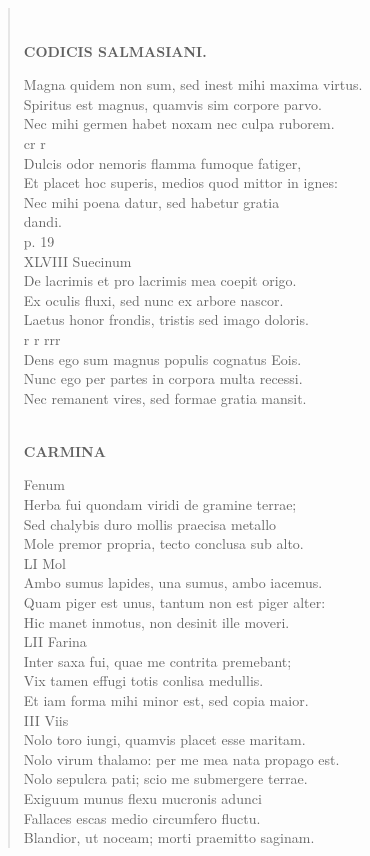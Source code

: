 \documentclass[11pt, a4paper]{report}
\begin{document}
\begin{verse}
        ﻿\pagebreak 
    \begin{center} \textbf{CODICIS SALMASIANI.} \end{center} \marginpar{[233]} Magna quidem non sum, sed inest mihi maxima virtus. \\ Spiritus est magnus, quamvis sim corpore parvo. \\ Nec mihi germen habet noxam nec culpa ruborem. \\ cr r \\ Dulcis odor nemoris flamma fumoque fatiger, \\ Et placet hoc superis, medios quod mittor in ignes: \\ Nec mihi poena datur, sed habetur gratia \\ dandi. \\ p. 19 \\ XLVIII Suecinum \\ De lacrimis et pro lacrimis mea coepit origo. \\ Ex oculis fluxi, sed nunc ex arbore nascor. \\ Laetus honor frondis, tristis sed imago doloris. \\ r r rrr \\ Dens ego sum magnus populis cognatus Eois. \\ Nunc ego per partes in corpora multa recessi. \\ Nec remanent vires, sed formae gratia mansit. \\ 
        ﻿\pagebreak 
    \begin{center} \textbf{CARMINA} \end{center} \marginpar{[234]}  \marginpar{[02]} Fenum \\ Herba fui quondam viridi de gramine terrae; \\ Sed chalybis duro mollis praecisa metallo \\ Mole premor propria, tecto conclusa sub alto. \\ LI Mol \\ Ambo sumus lapides, una sumus, ambo iacemus. \\ Quam piger est unus, tantum non est piger alter: \\ Hic manet inmotus, non desinit ille moveri. \\ LII Farina \\ Inter saxa fui, quae me contrita premebant; \\ Vix tamen effugi totis conlisa medullis. \\ Et iam forma mihi minor est, sed copia maior. \\ III Viis \\ Nolo toro iungi, quamvis placet esse maritam. \\ Nolo virum thalamo: per me mea nata propago est. \\ Nolo sepulcra pati; scio me submergere terrae. \\ Exiguum munus flexu mucronis adunci \\ Fallaces escas medio circumfero fluctu. \\ Blandior, ut noceam; morti praemitto saginam. \\ 

\end{verse}
\end{document}

